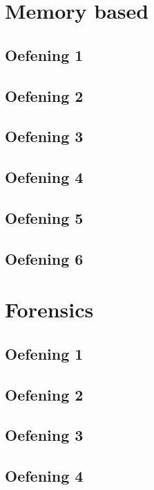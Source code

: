 \documentclass[a4paper,11pt]{report}
\begin{document}
\chapter{Memory based}
\section{Oefening 1}

\section{Oefening 2}

\section{Oefening 3}

\section{Oefening 4}

\section{Oefening 5}

\section{Oefening 6}


\newpage

\chapter{Forensics}
\section{Oefening 1}

\section{Oefening 2}

\section{Oefening 3}

\section{Oefening 4}

\end{document}
